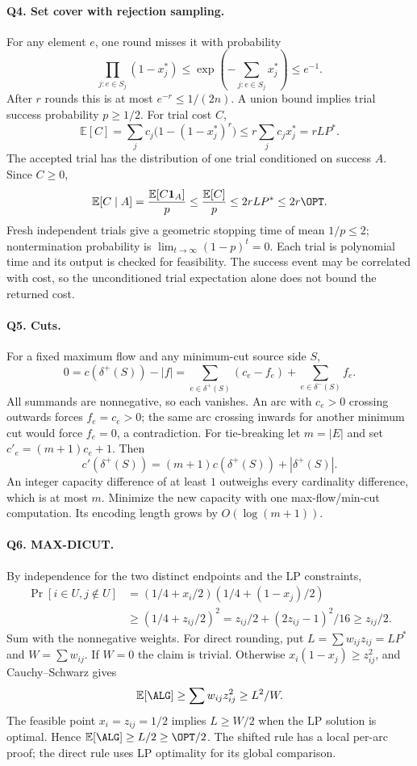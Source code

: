 \paragraph{Q4. Set cover with rejection sampling.}
For any element $e$, one round misses it with probability
\[
\prod_{j:e\in S_j}(1-x_j^*)
\le \exp\!\left(-\sum_{j:e\in S_j}x_j^*\right)\le e^{-1}.
\]
After $r$ rounds this is at most $e^{-r}\le1/(2n)$.  A union bound implies
trial success probability $p\ge1/2$.  For trial cost $C$,
\[
\mathbb E[C]=\sum_j c_j\bigl(1-(1-x_j^*)^r\bigr)
\le r\sum_j c_jx_j^*=rLP^*.
\]
The accepted trial has the distribution of one trial conditioned on success
$A$.  Since $C\ge0$,
\[
\mathbb E[C\mid A]
=\frac{\mathbb E[C\mathbf1_A]}p
\le\frac{\mathbb E[C]}p\le2rLP^*\le2r\OPT.
\]
Fresh independent trials give a geometric stopping time of mean $1/p\le2$;
nontermination probability is $\lim_{t\to\infty}(1-p)^t=0$.
Each trial is polynomial time and its output is checked for feasibility.
The success event may be correlated with cost, so the unconditioned trial
expectation alone does not bound the returned cost.

\paragraph{Q5. Cuts.}
For a fixed maximum flow and any minimum-cut source side $S$,
\[
0=c(\delta^+(S))-|f|
=\sum_{e\in\delta^+(S)}(c_e-f_e)
 +\sum_{e\in\delta^-(S)}f_e.
\]
All summands are nonnegative, so each vanishes.  An arc with $c_e>0$
crossing outwards forces $f_e=c_e>0$; the same arc crossing inwards for
another minimum cut would force $f_e=0$, a contradiction.
For tie-breaking let $m=|E|$ and set $c'_e=(m+1)c_e+1$.  Then
\[
c'(\delta^+(S))=(m+1)c(\delta^+(S))+|\delta^+(S)|.
\]
An integer capacity difference of at least $1$ outweighs every cardinality
difference, which is at most $m$.  Minimize the new capacity with one
max-flow/min-cut computation.  Its encoding length grows by $O(\log(m+1))$.

\paragraph{Q6. MAX-DICUT.}
By independence for the two distinct endpoints and the LP constraints,
\begin{align*}
\Pr[i\in U,j\notin U]
&=(1/4+x_i/2)(1/4+(1-x_j)/2)\\
&\ge(1/4+z_{ij}/2)^2
=z_{ij}/2+(2z_{ij}-1)^2/16\ge z_{ij}/2.
\end{align*}
Sum with the nonnegative weights.  For direct rounding, put
$L=\sum w_{ij}z_{ij}=LP^*$ and $W=\sum w_{ij}$.  If $W=0$ the claim is
trivial.  Otherwise $x_i(1-x_j)\ge z_{ij}^2$, and Cauchy--Schwarz gives
\[
\mathbb E[\ALG]\ge\sum w_{ij}z_{ij}^2\ge L^2/W.
\]
The feasible point $x_i=z_{ij}=1/2$ implies $L\ge W/2$ when the LP
solution is optimal.  Hence $\mathbb E[\ALG]\ge L/2\ge\OPT/2$.
The shifted rule has a local per-arc proof; the direct rule uses LP
optimality for its global comparison.

